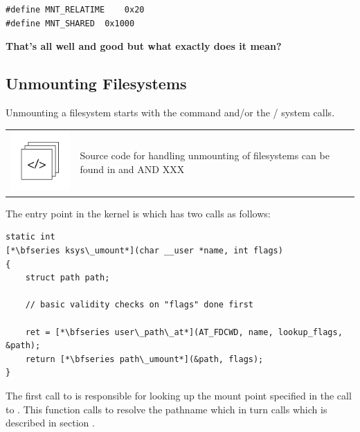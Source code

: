 \begin{lstlisting}
#define MNT_RELATIME	0x20
#define MNT_SHARED	0x1000
\end{lstlisting}

\noindent
\textbf{That's all well and good but what exactly does it mean?}


\subsection{Unmounting Filesystems}

Unmounting a filesystem starts with the  command and/or the  /  system calls.

\begin{table}[h]
\begin{tabular}{ll}
\parbox[l]{0.6in}{\includegraphics[scale=0.8]{figures/src-xref.pdf}} & \parbox[l]{4in}{\small{Source code for handling unmounting of filesystems can be found in  and  AND XXX}}
\end{tabular}
\end{table}

\noindent
The entry point in the kernel is  which has two calls as follows:

\begin{lstlisting}
static int 
[*\bfseries ksys\_umount*](char __user *name, int flags)
{
    struct path path;

    // basic validity checks on "flags" done first

    ret = [*\bfseries user\_path\_at*](AT_FDCWD, name, lookup_flags, &path);
    return [*\bfseries path\_umount*](&path, flags);
}
\end{lstlisting}

\noindent
The first call to  is responsible for looking up the mount point specified in the call to . This function calls  to resolve the pathname which in turn calls  which is described in section .

